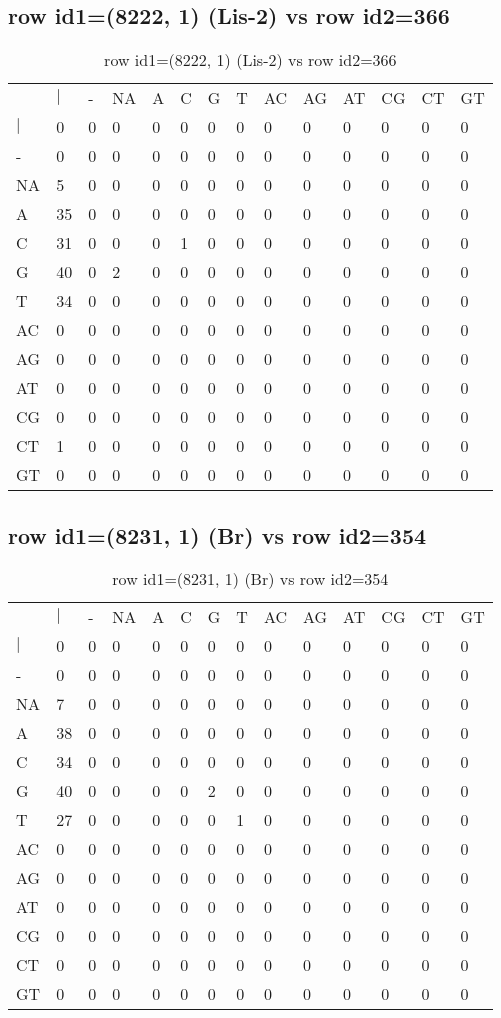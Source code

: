 \subsection{row id1=(8222, 1) (Lis-2) vs row id2=366}
\begin{center}
\begin{longtable}{|l|l|l|l|l|l|l|l|l|l|l|l|l|l|}
\caption{row id1=(8222, 1) (Lis-2) vs row id2=366} \label{table_dm348}\\
\hline
\\
\hline
&$|$&-&NA&A&C&G&T&AC&AG&AT&CG&CT&GT\\
$|$&0&0&0&0&0&0&0&0&0&0&0&0&0\\
-&0&0&0&0&0&0&0&0&0&0&0&0&0\\
NA&5&0&0&0&0&0&0&0&0&0&0&0&0\\
A&35&0&0&0&0&0&0&0&0&0&0&0&0\\
C&31&0&0&0&1&0&0&0&0&0&0&0&0\\
G&40&0&2&0&0&0&0&0&0&0&0&0&0\\
T&34&0&0&0&0&0&0&0&0&0&0&0&0\\
AC&0&0&0&0&0&0&0&0&0&0&0&0&0\\
AG&0&0&0&0&0&0&0&0&0&0&0&0&0\\
AT&0&0&0&0&0&0&0&0&0&0&0&0&0\\
CG&0&0&0&0&0&0&0&0&0&0&0&0&0\\
CT&1&0&0&0&0&0&0&0&0&0&0&0&0\\
GT&0&0&0&0&0&0&0&0&0&0&0&0&0\\
\hline
\end{longtable}
\end{center}

\subsection{row id1=(8231, 1) (Br) vs row id2=354}
\begin{center}
\begin{longtable}{|l|l|l|l|l|l|l|l|l|l|l|l|l|l|}
\caption{row id1=(8231, 1) (Br) vs row id2=354} \label{table_dm350}\\
\hline
\\
\hline
&$|$&-&NA&A&C&G&T&AC&AG&AT&CG&CT&GT\\
$|$&0&0&0&0&0&0&0&0&0&0&0&0&0\\
-&0&0&0&0&0&0&0&0&0&0&0&0&0\\
NA&7&0&0&0&0&0&0&0&0&0&0&0&0\\
A&38&0&0&0&0&0&0&0&0&0&0&0&0\\
C&34&0&0&0&0&0&0&0&0&0&0&0&0\\
G&40&0&0&0&0&2&0&0&0&0&0&0&0\\
T&27&0&0&0&0&0&1&0&0&0&0&0&0\\
AC&0&0&0&0&0&0&0&0&0&0&0&0&0\\
AG&0&0&0&0&0&0&0&0&0&0&0&0&0\\
AT&0&0&0&0&0&0&0&0&0&0&0&0&0\\
CG&0&0&0&0&0&0&0&0&0&0&0&0&0\\
CT&0&0&0&0&0&0&0&0&0&0&0&0&0\\
GT&0&0&0&0&0&0&0&0&0&0&0&0&0\\
\hline
\end{longtable}
\end{center}

